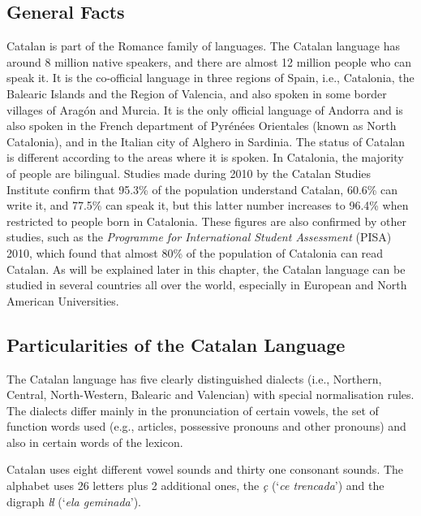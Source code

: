 \begin{multicols}{2}

\subsection{General Facts}

    Catalan is part of the Romance family of languages. The Catalan language has around 8 million native speakers, and there are almost 12 million people who can speak it. It is the co-official language in three regions of Spain, i.e., Catalonia, the Balearic Islands and the Region of Valencia, and also spoken in some border villages of Aragón and Murcia.  It is the only official language of Andorra and is also spoken in the French department of Pyrénées Orientales (known as North Catalonia), and in the Italian city of Alghero in Sardinia.
The status of Catalan is different according to the areas where it is spoken. In Catalonia, the majority of people are bilingual. Studies made during 2010 by the Catalan Studies Institute confirm that 95.3\% of the population understand Catalan, 60.6\% can write it, and 77.5\% can speak it, but this latter number increases to 96.4\% when restricted to people born in Catalonia. These figures are also confirmed by other studies, such as the \textit{Programme for International Student Assessment} (PISA)  2010, which found that almost 80\% of the population of Catalonia can read Catalan. 
As will be explained later in this chapter, the Catalan language can be studied in several countries all over the world, especially in European and North American Universities.

\subsection{Particularities of the Catalan Language}

The Catalan language has five clearly distinguished dialects (i.e., Northern, Central, North-Western, Balearic and Valencian) with special normalisation rules. The dialects differ mainly in the pronunciation of certain vowels, the set of function words used (e.g., articles, possessive pronouns and other pronouns) and also in certain words of the lexicon. 

Catalan uses eight different vowel sounds and thirty one consonant sounds. The alphabet uses 26 letters plus 2 additional ones, the \textit{ç} (‘\textit{ce trencada}’) and the digraph \textit{ŀl} (‘\textit{ela geminada}’).


\end{multicols}
